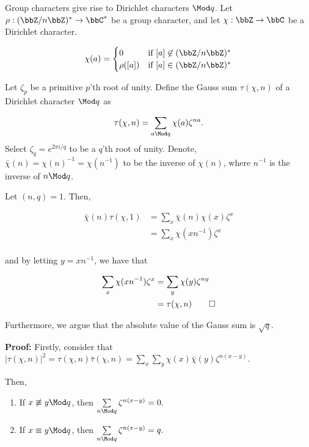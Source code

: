 \documentclass[a4paper, 12pt,oneside,openany]{book}
\begin{document}
Group characters give rise to Dirichlet characters $\Mod q$. Let $\rho:(\bbZ/n\bbZ)^* \to \bbC^*$ be a group character, and let $\chi:\bbZ\to\bbC$ be a Dirichlet character.

$$\chi(a)=\begin{cases} 0 & \text{if}\ [a] \not\in (\bbZ/n\bbZ)^* \\ \rho([a]) & \text{if}\ [a] \in (\bbZ/n\bbZ)^* \end{cases}$$

Let $\zeta_p$ be a primitive $p$'th root of unity. Define the Gauss sum $\tau(\chi, n)$ of a Dirichlet character $\Mod q$ as

$$\tau(\chi, n) = \sum\limits_{a \Mod q} \chi(a) \zeta^{na}.$$ Select $\zeta_q=e^{2\pi i/q}$ to be a $q$'th root of unity. Denote, $\bar{\chi}(n)=\chi(n)^{-1}=\chi(n^{-1})$ to be the inverse of $\chi(n)$, where $n^{-1}$ is the inverse of $n \Mod q$.


 Let $(n, q)=1$. Then, 

\begin{align*}
	\bar{\chi}(n) \tau(\chi, 1) &= \sum\limits_x \bar{\chi}(n) \chi(x) \zeta^x \\ 
	&= \sum\limits_x \chi(xn^{-1})\zeta^x \\
\end{align*}

and by letting $y=xn^{-1}$, we have that 

\begin{align*}
	\sum\limits_x \chi(xn^{-1})\zeta^x &= \sum\limits_y \chi(y) \zeta^{ny} \\ &= \tau(\chi, n) \qed
\end{align*}

Furthermore, we argue that the absolute value of the Gauss sum is $\sqrt{q}$.


\textbf{Proof:} Firstly, consider that $|\tau(\chi, n)|^2=\tau(\chi, n)\bar{\tau}(\chi, n)=\sum\limits_x \sum\limits_y \chi(x)\bar{\chi}(y) \zeta^{n(x-y)}.$

Then, 

\begin{enumerate}
	\item If $x \not\equiv y \Mod q$, then $\sum\limits_{n \Mod q} \zeta^{n(x-y)} = 0.$
	\item If $x \equiv y \Mod q$, then $\sum\limits_{n \Mod q} \zeta^{n(x-y)} = q.$
\end{enumerate}
\end{document}
